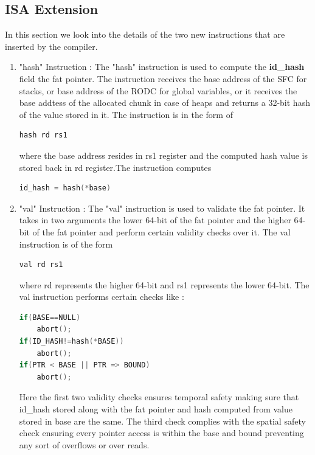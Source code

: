 \subsection{ISA Extension} \label{ISA} In this section we look into the details of the two new instructions that are inserted by the compiler. 
\begin{enumerate} 
    \item "hash" Instruction \label{hash}: The "hash" instruction is used to compute the \textbf{id\_hash} field the fat pointer. The instruction receives the base address of the SFC for stacks, or base address of the RODC for global variables, or it receives the base addtess of the allocated chunk in case of heaps and returns a 32-bit hash of the value stored in it. The instruction is in the form of 
            \begin{lstlisting}[language=C]
hash rd rs1
        \end{lstlisting}
    where the base address resides in rs1 register and the computed hash value is stored back in rd register.The instruction computes
    \begin{lstlisting}[language=C]
id_hash = hash(*base)
    \end{lstlisting}
    
    \item "val" Instruction \label{val}: The "val" instruction is used to validate the fat pointer. It takes in two arguments the lower 64-bit of the fat pointer and the higher 64-bit of the fat pointer and perform certain validity checks over it. The val instruction is of the form 
            \begin{lstlisting}[language=C]
val rd rs1
        \end{lstlisting}
    where rd represents the higher 64-bit and rs1 represents the lower 64-bit. The val instruction performs certain checks like : 
    \begin{lstlisting}[language=C]
if(BASE==NULL) 
    abort();
if(ID_HASH!=hash(*BASE))
    abort();
if(PTR < BASE || PTR => BOUND)
    abort();
\end{lstlisting}

Here the first two validity checks ensures temporal safety making sure that id\_hash stored along with the fat pointer and hash computed from value stored in base are the same. The third check complies with the spatial safety check ensuring every pointer access is within the base and bound preventing any sort of overflows or over reads. 

\end{enumerate}
